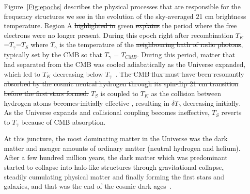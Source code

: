 	Figure~\ref{Fig:epochs} describes the physical processes that are responsible for the frequency structures we see in the evolution of the sky-averaged 21 cm brightness temperature.  Region A \st{highlighted in} green\attention{)} \st{explains}  the  period where the free electrons were no longer present. During this epoch\attention{,} right after recombination\attention{,} $T_K$=$T_\gamma$=$T_S$ where $T_\gamma$ is the temperature of the  \st{neighbouring bath of radio photons}, typically set by the CMB so that $T_\gamma$ = $T_{CMB}$. During this period, matter that had separated from the CMB was cooled adiabatically as the Universe expanded, which led to $T_K$ decreasing below $T_\gamma$~\citep{2006PhR...433..181F}. \st{The CMB flux must have been resonantly absorbed by the cosmic neutral hydrogen through its spin-flip 21 cm transition before the first stars formed.}  $T_S$ is  coupled to $T_K$ as the collision between hydrogen atoms \st{becomes initially}  effective , resulting in $\delta T_b$ decreasing \st{initially}. As the Universe expands and collisional coupling becomes ineffective, $T_S$ reverts to $T_\gamma$ because of CMB absorption.
	
	At this juncture, the most dominating matter in the Universe was the dark matter and meager amounts of ordinary matter (neutral hydrogen and helium). After a few hundred million years, the dark matter which was predominant started to collapse into halo-like structures through gravitational collapse, steadily cumulating physical matter and finally forming the first stars and galaxies, and that was the end of the cosmic dark ages~\citep{2003Sci...300.1904M}. 
	
	
